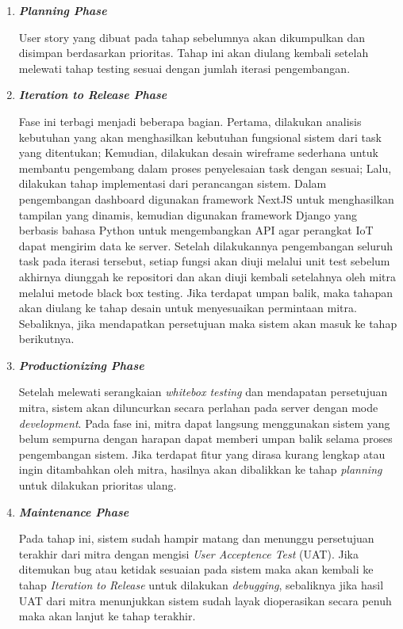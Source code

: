 \begin{enumerate}
\begin{enumerate}[label*=\arabic*.]
\begin{enumerate}[label*=\arabic*.]
            \item \textbf{\textit{Planning Phase}}

            User story yang dibuat pada tahap sebelumnya akan dikumpulkan dan disimpan berdasarkan prioritas. Tahap ini akan diulang kembali setelah melewati tahap testing sesuai dengan jumlah iterasi pengembangan.

            \item \textbf{\textit{Iteration to Release Phase}}

            Fase ini terbagi menjadi beberapa bagian. Pertama, dilakukan analisis kebutuhan yang akan menghasilkan kebutuhan fungsional sistem dari task yang ditentukan; Kemudian, dilakukan desain wireframe sederhana untuk membantu pengembang dalam proses penyelesaian task dengan sesuai; Lalu, dilakukan tahap implementasi dari perancangan sistem. Dalam pengembangan dashboard digunakan framework NextJS untuk menghasilkan tampilan yang dinamis, kemudian digunakan framework Django yang berbasis bahasa Python untuk mengembangkan API agar perangkat IoT dapat mengirim data ke server. Setelah dilakukannya pengembangan seluruh task pada iterasi tersebut, setiap fungsi akan diuji melalui unit test sebelum akhirnya diunggah ke repositori dan akan diuji kembali setelahnya oleh mitra melalui metode black box testing. Jika terdapat umpan balik, maka tahapan akan diulang ke tahap desain untuk menyesuaikan permintaan mitra. Sebaliknya, jika mendapatkan persetujuan maka sistem akan masuk ke tahap berikutnya.

            \item \textbf{\textit{Productionizing Phase}}

            Setelah melewati serangkaian \textit{whitebox testing} dan mendapatan persetujuan mitra, sistem akan diluncurkan secara perlahan pada server dengan mode \textit{development}. Pada fase ini, mitra dapat langsung menggunakan sistem yang belum sempurna dengan harapan dapat memberi umpan balik selama proses pengembangan sistem. Jika terdapat fitur yang dirasa kurang lengkap atau ingin ditambahkan oleh mitra, hasilnya akan dibalikkan ke tahap \textit{planning} untuk dilakukan prioritas ulang.

            \item \textbf{\textit{Maintenance Phase}}

            Pada tahap ini, sistem sudah hampir matang dan menunggu persetujuan terakhir dari mitra dengan mengisi \textit{User Acceptence Test} (UAT). Jika ditemukan bug atau ketidak sesuaian pada sistem maka akan kembali ke tahap \textit{Iteration to Release} untuk dilakukan \textit{debugging}, sebaliknya jika hasil UAT dari mitra menunjukkan sistem sudah layak dioperasikan secara penuh maka akan lanjut ke tahap terakhir.



\end{enumerate}
\end{enumerate}
\end{enumerate}
